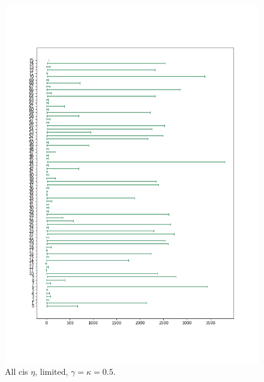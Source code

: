 \begin{figure}
    \centering
    \includegraphics[scale=0.48]{pictures/Gamma=kappa=0.5/all_cis_eta_lim.png}
    \caption{All cis $\eta$, limited, $\gamma=\kappa=0.5$.}
    \label{fig:all_cis_eta_lim_gk0.5}
\end{figure}


